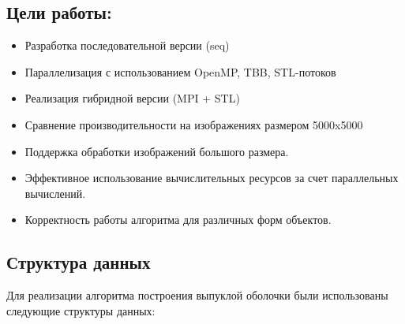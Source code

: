 \documentclass[12pt]{article}
\begin{document}
\subsection{Цели работы:}
\begin{itemize}
    \item Разработка последовательной версии (seq)
    \item Параллелизация с использованием OpenMP, TBB, STL-потоков
    \item Реализация гибридной версии (MPI + STL)
    \item Сравнение производительности на изображениях размером 5000x5000
    \item Поддержка обработки изображений большого размера.
    \item Эффективное использование вычислительных ресурсов за счет параллельных вычислений.
    \item Корректность работы алгоритма для различных форм объектов.
\end{itemize}

\subsection{Структура данных}
Для реализации алгоритма построения выпуклой оболочки были использованы следующие структуры данных:
\end{document}
